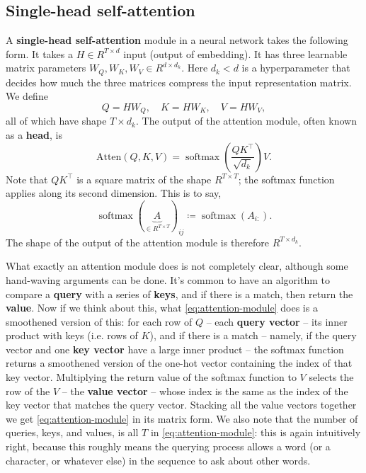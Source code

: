 \documentclass[hyperref, a4paper, 12pt]{report}
\DeclareMathOperator{\softmax}{softmax}
\newcommand*{\concept}[1]{{\textbf{#1}}}
\def\mathbb#1{#1}%
\begin{document}
\subsection{Single-head self-attention}

A \concept{single-head self-attention} module in a neural network takes the following form.
It takes a $H \in \mathbb{R}^{T \times d}$ input (output of embedding).
It has three learnable matrix parameters $W_Q, W_K, W_V \in \mathbb{R}^{d \times d_k}$.
Here $d_k < d$ is a hyperparameter that decides how much the three matrices compress the input representation matrix.
We define 
\begin{equation}
    Q = H W_Q, \quad K = H W_K, \quad V = H W_V,
    \label{eq:transformer-projection}
\end{equation}
all of which have shape $T \times d_k$.
The output of the attention module, often known as a \concept{head}, is 
\begin{equation}
    \mathrm{Atten}(Q, K, V) = \softmax\left(\frac{Q K^\top}{\sqrt{d_k}}\right) V.
    \label{eq:attention-module}
\end{equation}
Note that $QK^\top$ is a square matrix of the shape $\mathbb{R}^{T \times T}$; the softmax function applies along its second dimension.
This is to say,
\begin{equation}
    \softmax( \underbrace{A}_{\in \mathbb{R}^{T \times T} } )_{ij} \coloneqq \softmax(A_{i:}).
\end{equation}
The shape of the output of the attention module is therefore $\mathbb{R}^{T \times d_k}$.

What exactly an attention module does is not completely clear,
although some hand-waving arguments can be done.
It's common to have an algorithm to compare a \concept{query} with a series of \concept{keys},
and if there is a match, then return the \concept{value}.
Now if we think about this, what \eqref{eq:attention-module} does is a smoothened version of this:
for each row of $Q$ -- each \concept{query vector} -- its inner product with keys (i.e. rows of $K$),
and if there is a match -- namely, if the query vector and one \concept{key vector} have a large inner product -- 
the softmax function returns a smoothened version of the one-hot vector containing the index of that key vector.
Multiplying the return value of the softmax function to $V$ 
selects the row of the $V$ -- the \concept{value vector} -- 
whose index is the same as the index of the key vector that matches the query vector.
Stacking all the value vectors together we get \eqref{eq:attention-module} in its matrix form.
We also note that the number of queries, keys, and values, is all $T$ in \eqref{eq:attention-module}:
this is again intuitively right,
because this roughly means the querying process 
allows a word (or a character, or whatever else) in the sequence to ask about other words.
\end{document}
